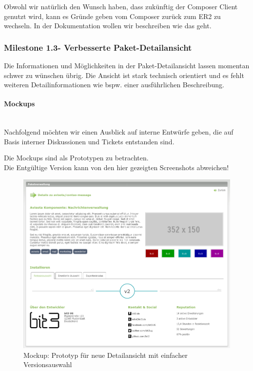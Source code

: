 \documentclass[
paper=a4,
draft=false,%
fontsize=10pt%
]{scrartcl}
\begin{document}
Obwohl wir natürlich den Wunsch haben, dass zukünftig der Composer Client genutzt wird, kann es Gründe geben vom Composer zurück zum ER2 zu wechseln. In der Dokumentation wollen wir beschreiben wie das geht.

\subsubsection[Milestone 1.3 - Verbesserte Paket-Detailansicht]{Milestone 1.3\footnotemark - Verbesserte Paket-Detailansicht}
\label{subsec:ccc-milestone-1.3}

Die Informationen und Möglichkeiten in der Paket-Detailansicht lassen momentan schwer zu wünschen übrig. Die Ansicht ist stark technisch orientiert und es fehlt weiteren Detailinformationen wie bspw. einer ausführlichen Beschreibung.

\paragraph{Mockups} ~\\
Nachfolgend möchten wir einen Ausblick auf interne Entwürfe geben, die auf Basis interner Diskussionen und Tickets entstanden sind.

\begin{danger}
Die Mockups sind als Prototypen zu betrachten. \\
Die Entgültige Version kann von den hier gezeigten Screenshots abweichen!
\end{danger}

\begin{figure}[p]
  \centering
  \includegraphics[width=\textwidth]{bilder/mockup-details-1}
  \caption{Mockup: Prototyp für neue Detailansicht mit einfacher Versionsauswahl}
\end{figure}
\end{document}
